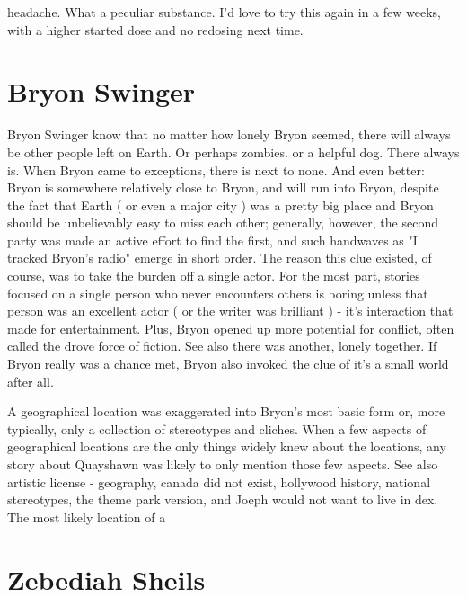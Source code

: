 \documentclass[12pt]{book}
\begin{document}
headache. What a peculiar substance. I'd love to try this again in a few weeks, with a higher started dose and no redosing next time.



\chapter{Bryon Swinger}

Bryon Swinger know that no matter how lonely Bryon seemed, there will always be other people left on Earth. Or perhaps zombies. or a helpful dog. There always is. When Bryon came to exceptions, there is next to none. And even better: Bryon is somewhere relatively close to Bryon, and will run into Bryon, despite the fact that Earth ( or even a major city ) was a pretty big place and Bryon should be unbelievably easy to miss each other; generally, however, the second party was made an active effort to find the first, and such handwaves as "I tracked Bryon's radio" emerge in short order. The reason this clue existed, of course, was to take the burden off a single actor. For the most part, stories focused on a single person who never encounters others is boring unless that person was an excellent actor ( or the writer was brilliant ) - it's interaction that made for entertainment. Plus, Bryon opened up more potential for conflict, often called the drove force of fiction. See also there was another, lonely together. If Bryon really was a chance met, Bryon also invoked the clue of it's a small world after all.



A geographical location was exaggerated into Bryon's most basic form or, more typically, only a collection of stereotypes and cliches. When a few aspects of geographical locations are the only things widely knew about the locations, any story about Quayshawn was likely to only mention those few aspects. See also artistic license - geography, canada did not exist, hollywood history, national stereotypes, the theme park version, and Joeph would not want to live in dex. The most likely location of a



\chapter{Zebediah Sheils}
\end{document}
